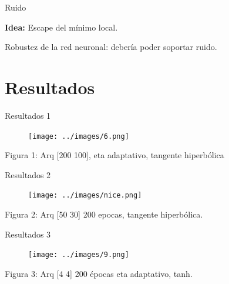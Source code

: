 \documentclass{beamer}
\begin{document}
\begin{frame}{Ruido}
\par \textbf{Idea:} Escape del mínimo local.\\
\par Robustez de la red neuronal: debería poder soportar ruido.
\end{frame}

\section{Resultados}

\begin{frame}{Resultados 1}
\begin{figure}[H]
\begin{center}
\texttt{[image: ../images/6.png]}
\label{modelado}
\end{center}
\end{figure}

\begin{center}
\par Figura 1: Arq [200 100], eta adaptativo, tangente hiperbólica
\end{center}
\end{frame}

\begin{frame}{Resultados 2}
\begin{figure}[H]
\begin{center}
\texttt{[image: ../images/nice.png]}
\label{modelado}
\end{center}
\end{figure}

\begin{center}
\par Figura 2: Arq [50 30] 200 epocas, tangente hiperbólica.
\end{center}
\end{frame}

\begin{frame}{Resultados 3}
\begin{figure}[H]
\begin{center}
\texttt{[image: ../images/9.png]}
\label{modelado}
\end{center}
\end{figure}

\begin{center}
\par Figura 3: Arq [4 4] 200 épocas eta adaptativo, tanh.
\end{center}
\end{frame}
\end{document}
